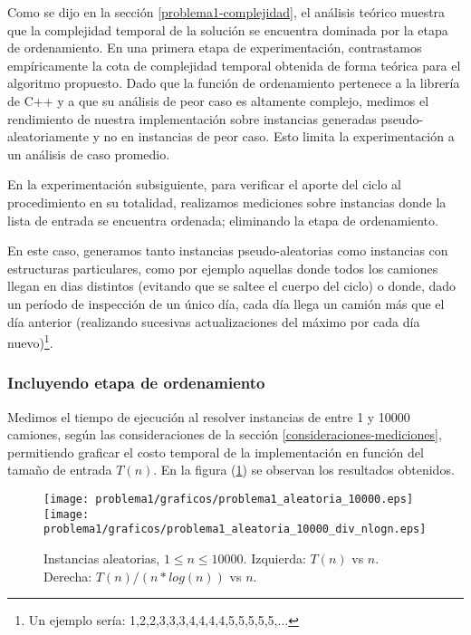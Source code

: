 Como se dijo en la sección \ref{problema1-complejidad}, el análisis teórico muestra que la complejidad temporal de la solución se encuentra dominada por la etapa de ordenamiento. En una primera etapa de experimentación, contrastamos empíricamente la cota de complejidad temporal obtenida de forma teórica para el algoritmo propuesto. Dado que la función de ordenamiento pertenece a la librería de C++ y a que su análisis de peor caso es altamente complejo, medimos el rendimiento de nuestra implementación sobre instancias generadas pseudo-aleatoriamente y no en instancias de peor caso. Esto limita la experimentación a un análisis de caso promedio.

En la experimentación subsiguiente, para verificar el aporte del ciclo al procedimiento en su totalidad, realizamos mediciones sobre instancias donde la lista de entrada se encuentra ordenada; eliminando la etapa de ordenamiento.

En este caso, generamos tanto instancias pseudo-aleatorias como instancias con estructuras particulares, como por ejemplo aquellas donde todos los camiones llegan en dias distintos (evitando que se saltee el cuerpo del ciclo) o donde, dado un período de inspección de un único día, cada día llega un camión más que el día anterior (realizando sucesivas actualizaciones del máximo por cada día nuevo)\footnote{Un ejemplo sería: 1,2,2,3,3,3,4,4,4,4,5,5,5,5,5,...}.

\subsubsection{Incluyendo etapa de ordenamiento}

Medimos el tiempo de ejecución al resolver instancias de entre 1 y 10000 camiones, según las consideraciones de la sección \ref{consideraciones-mediciones}, permitiendo graficar el costo temporal de la implementación en función del tamaño de entrada $T(n)$. En la figura (\ref{fig:problema1-aleatoria-10000}) se observan los resultados obtenidos.

\begin{center}
  \begin{figure}[H]
    \texttt{[image: problema1/graficos/problema1\_aleatoria\_10000.eps]}
    \texttt{[image: problema1/graficos/problema1\_aleatoria\_10000\_div\_nlogn.eps]}
    \caption{Instancias aleatorias, $1 \leq n \leq 10000$. Izquierda: $T(n)$ vs $n$. Derecha: $T(n) / (n * log(n))$ vs $n$.}
    \label{fig:problema1-aleatoria-10000}
  \end{figure}
\end{center}

